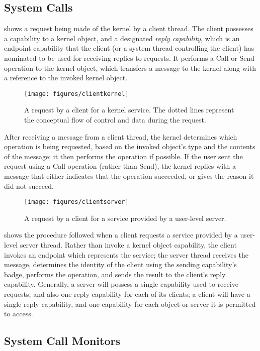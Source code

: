 \subsection{System Calls}

 shows a request being made of the kernel by a
client thread. The client possesses a capability to a kernel object, and a
designated \emph{reply capability}, which is an endpoint capability that the
client (or a system thread controlling the client) has nominated to be used
for receiving replies to requests. It performs a Call or Send operation to the kernel
object, which transfers a message to the kernel along with a reference to the
invoked kernel object.

\begin{figure}
\centering \texttt{[image: figures/clientkernel]}
\caption[clientkernel]{A request by a client for a kernel service. The dotted lines
represent the conceptual flow of control and data during the
request.}
\end{figure}

After receiving a message from a client thread, the kernel determines which
operation is being requested, based on the invoked object's type and the
contents of the message; it then performs the operation if possible. If the user sent the request using a Call operation (rather than Send), the kernel replies with a message that either indicates that the operation succeeded, or gives the reason it did not succeed.

\begin{figure}
\centering \texttt{[image: figures/clientserver]}
\caption[clientserver]{A request by a client for a service provided by a user-level server.}
\end{figure}

 shows the procedure followed when a client
requests a service provided by a user-level server thread. Rather than invoke
a kernel object capability, the client invokes an endpoint which represents
the service; the server thread receives the message, determines the identity
of the client using the sending capability's badge, performs the operation,
and sends the result to the client's reply capability. Generally, a server
will possess a single capability used to receive requests, and also one reply
capability for each of its clients; a client will have a single reply
capability, and one capability for each object or server it is permitted to
access.

\subsection{System Call Monitors}\label{sec:sel4:monitors}

